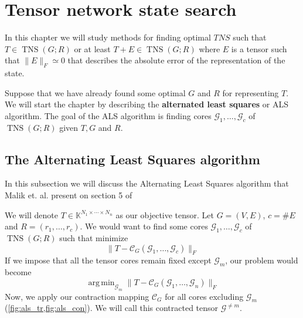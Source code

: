 \documentclass[11pt,a4paper,openright,oneside]{book}
\numberwithin{equation}{section}
\newcommand{\figref}[1]{\cref{#1}}
\DeclareMathOperator{\TNS}{TNS}
\DeclareMathOperator*{\argmin}{arg\,min}
\begin{document}
{\begin{algorithm}[H]
\begin{algorithmic}[1]
    \end{algorithmic}

\end{algorithm}



\chapter{Tensor network state search}

In this chapter we will study methods for finding optimal $TNS$ such that $T \in \TNS(G; R)$ or at least
$T + E \in \TNS(G; R)$ where $E$ is a tensor such that $\|E\|_F \simeq 0$ that describes the absolute error of the representation
of the state.

Suppose that we have already found some optimal $G$ and $R$ for representing $T$. We will 
start the chapter by describing the \textbf{alternated least squares} or ALS
algorithm. The goal of the ALS algorithm is finding cores $\mathcal{G}_1, \dots, \mathcal{G}_c$ of $\TNS(G; R)$ given $T, G$ and $R$.


\section{The Alternating Least Squares algorithm}

In this subsection we will discuss the Alternating Least Squares algorithm that Malik et. al. present on section 5 of
\cite{malikSamplingBasedDecompositionAlgorithms2022}

We will denote $T \in \mathbb{K}^{N_1 \times \cdots \times N_n}$ as our objective tensor. Let $G = (V, E)$, $c = \#E$ and $R = (r_1, \dots, r_c)$.
We would want to find some cores
$\mathcal{G}_1, \dots, \mathcal{G}_c$ of $\TNS(G; R)$ such that minimize
$$\|T - \mathcal{C}_G (\mathcal{G}_1, \dots, \mathcal{G}_c)\|_F$$
If we impose that all the tensor cores remain fixed except $\mathcal{G}_m$, our problem would become
$$\argmin_{\mathcal{G}_m} \|T - \mathcal{C}_G(\mathcal{G}_1, \dots, \mathcal{G}_n)\|_F$$
Now, we apply our contraction mapping $\mathcal{C}_G$ for all cores excluding $\mathcal{G}_m$ (\figref{fig:als_tr,fig:als_con}).
We will call this contracted tensor $\mathcal{G}^{\neq m}$. 

\begin{figure}[H]

    \centering
   \begin{minipage}{0\textwidth}
\end{minipage}
\end{figure}}
\end{document}
